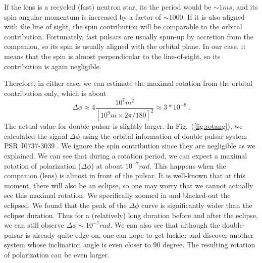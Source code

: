 \documentclass[aps,showpacs,twocolumn,floats,prd,superscriptaddress,nofootinbib]{revtex4-1}
\begin{document}
If the lens is a recycled (fast) neutron star, its the period would be $\sim 1ms$, and its spin angular momentum is increased by a factor of $\sim1000$.
If it is also aligned with the line of sight, the spin contribution will be comparable to the orbital contribution.
Fortunately, fast pulsars are usually spun-up by accretion from the companion, so its spin is usually aligned with the orbital plane.
In our case, it means that the spin is almost perpendicular to the line-of-sight, so its contribution is again negligible.

Therefore, in either case, we can estimate the maximal rotation from the orbital contribution only, which is about\begin{equation}
\Delta\phi \approx 4 \frac{10^7 m^2}{\left[  10^9m\times  2\pi / 180 \right]^2}\approx 3*10^{-8}~.
\end{equation}
The actual value for double pulsar is slightly larger.
In Fig.~(\ref{fig:rotang}), we calculated the signal $\Delta \phi$ using the orbital information of double pulsar system PSR J0737-3039 \cite{KraSta97}. 
We ignore the spin contribution since they are negligible as we explained. 
We can see that during a rotation period, we can expect a maximal rotation of polarization ($\Delta\phi$) at about $10^{-7} rad$. 
This happens when the companion (lens) is almost in front of the pulsar.
It is well-known that at this moment, there will also be an eclipse, so one may worry that we cannot actually see this maximal rotation.
We specifically zoomed in and blacked-out the eclipsed.
We found that the peak of the $\Delta\phi$ curve is significantly wider than the eclipse duration.
Thus for a (relatively) long duration before and after the eclipse, we can still observe $\Delta\phi\sim10^{-7}rad$.
We can also see that although the double-pulsar is already quite edge-on, one can hope to get luckier and discover another system whose inclination angle is even closer to $90$ degree.
The resulting rotation of polarization can be even larger.




\end{document}
